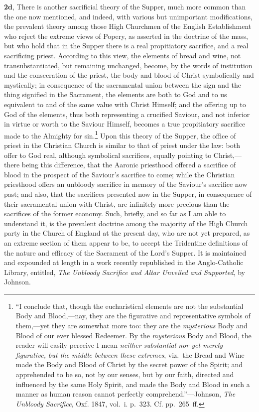 \documentclass[
]{book}
\begin{document}
\textbf{2d}, There is another sacrificial theory of the Supper, much more common than the one now mentioned, and indeed, with various but unimportant modifications, the prevalent theory among those High Churchmen of the English Establishment who reject the extreme views of Popery, as asserted in the doctrine of the mass, but who hold that in the Supper there is a real propitiatory sacrifice, and a real sacrificing priest. According to this view, the elements of bread and wine, not transubstantiated, but remaining unchanged, become, by the words of institution and the consecration of the priest, the body and blood of Christ symbolically and mystically; in consequence of the sacramental union between the sign and the thing signified in the Sacrament, the elements are both to God and to us equivalent to and of the same value with Christ Himself; and the offering up to God of the elements, thus both representing a crucified Saviour, and not inferior in virtue or worth to the Saviour Himself, becomes a true propitiatory sacrifice made to the Almighty for sin.\footnote{``I conclude that, though the eucharistical elements are not the substantial Body and Blood,---nay, they are the figurative and representative symbols of them,---yet they are somewhat more too: they are the \emph{mysterious} Body and Blood of our ever blessed Redeemer. By the \emph{mysterious} Body and Blood, the reader will easily perceive I mean \emph{neither substantial nor yet merely figurative, but the middle between these extremes}, viz.~the Bread and Wine made the Body and Blood of Christ by the secret power of the Spirit; and apprehended to be so, not by our senses, but by our faith, directed and influenced by the same Holy Spirit, and made the Body and Blood in such a manner as human reason cannot perfectly comprehend.''---Johnson, \emph{The Unbloody Sacrifice}, Oxf. 1847, vol.~i. p.~323. Cf. pp.~265~ff.} Upon this theory of the Supper, the office of priest in the Christian Church is similar to that of priest under the law: both offer to God real, although symbolical sacrifices, equally pointing to Christ,---there being this difference, that the Aaronic priesthood offered a sacrifice of blood in the prospect of the Saviour's sacrifice to come; while the Christian priesthood offers an unbloody sacrifice in memory of the Saviour's sacrifice now past; and also, that the sacrifices presented now in the Supper, in consequence of their sacramental union with Christ, are infinitely more precious than the sacrifices of the former economy. Such, briefly, and so far as I am able to understand it, is the prevalent doctrine among the majority of the High Church party in the Church of England at the present day, who are not yet prepared, as an extreme section of them appear to be, to accept the Tridentine definitions of the nature and efficacy of the Sacrament of the Lord's Supper. It is maintained and expounded at length in a work recently republished in the Anglo-Catholic Library, entitled, \emph{The Unbloody Sacrifice and Altar Unveiled and Supported}, by Johnson.
\end{document}
